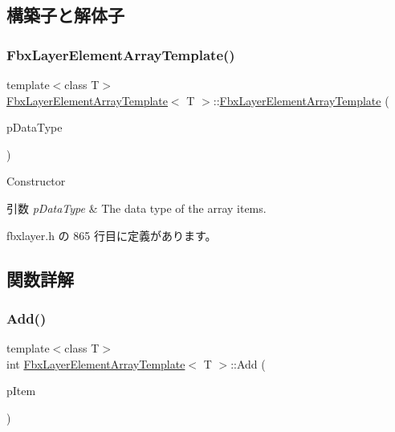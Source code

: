 \subsection{構築子と解体子}
\mbox{\label{class_fbx_layer_element_array_template_a624afc7ae56a5caacacd69bcb8bf9ba8}} 
\subsubsection{\texorpdfstring{Fbx\+Layer\+Element\+Array\+Template()}{FbxLayerElementArrayTemplate()}}
{\footnotesize\ttfamily template$<$class T$>$ \\
\hyperlink{class_fbx_layer_element_array_template}{Fbx\+Layer\+Element\+Array\+Template}$<$ T $>$\+::\hyperlink{class_fbx_layer_element_array_template}{Fbx\+Layer\+Element\+Array\+Template} (\begin{DoxyParamCaption}\item[{\hyperlink{fbxpropertytypes_8h_a73913a5ddfb20e57c6f25e9e6784bd92}{E\+Fbx\+Type}}]{p\+Data\+Type }\end{DoxyParamCaption})\hspace{0.3cm}{\ttfamily [inline]}}

Constructor 
\begin{DoxyParams}{引数}
{\em p\+Data\+Type} & The data type of the array items. \\
\hline
\end{DoxyParams}


 fbxlayer.\+h の 865 行目に定義があります。



\subsection{関数詳解}
\mbox{\label{class_fbx_layer_element_array_template_acc403e924944fe9921dac121156bf963}} 
\subsubsection{\texorpdfstring{Add()}{Add()}}
{\footnotesize\ttfamily template$<$class T$>$ \\
int \hyperlink{class_fbx_layer_element_array_template}{Fbx\+Layer\+Element\+Array\+Template}$<$ T $>$\+::Add (\begin{DoxyParamCaption}\item[{T const \&}]{p\+Item }\end{DoxyParamCaption})\hspace{0.3cm}{\ttfamily [inline]}}


